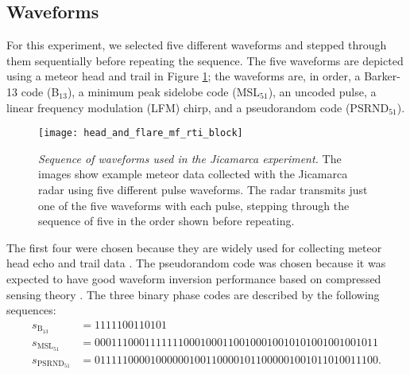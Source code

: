 \subsection{Waveforms}
For this experiment, we selected five different waveforms and stepped through them sequentially before repeating the sequence. The five waveforms are depicted using a meteor head and trail in Figure \ref{fig:waveform_sequence}; the waveforms are, in order, a Barker-13 code (B$_\text{13}$), a minimum peak sidelobe code (MSL$_\text{51}$), an uncoded pulse, a linear frequency modulation (LFM) chirp, and a pseudorandom code (PSRND$_\text{51}$).
\begin{figure}[tpb]
 \centering
 \texttt{[image: head\_and\_flare\_mf\_rti\_block]}
 \caption[Sequence of waveforms used in the Jicamarca experiment]{\emph{Sequence of waveforms used in the Jicamarca experiment.} The images show example meteor data collected with the Jicamarca radar using five different pulse waveforms. The radar transmits just one of the five waveforms with each pulse, stepping through the sequence of five in the order shown before repeating.}
 \label{fig:waveform_sequence}
\end{figure}%
The first four were chosen because they are widely used for collecting meteor head echo and trail data \autocite{WPW96, ELWF01, MBMH08, COHD02}. The pseudorandom code was chosen because it was expected to have good waveform inversion performance based on compressed sensing theory \autocite{BSN08, PR10}. The three binary phase codes are described by the following sequences:
\begin{align}
 s_{\text{B}_\text{13}} &= 1111100110101\nonumber\\
 s_{\text{MSL}_\text{51}} &= 000111000111111100010001100100010010101001001001011\nonumber\\
 s_{\text{PSRND}_\text{51}} &= 011111000010000001001100001011000001001011010011100\nonumber.
\end{align}

